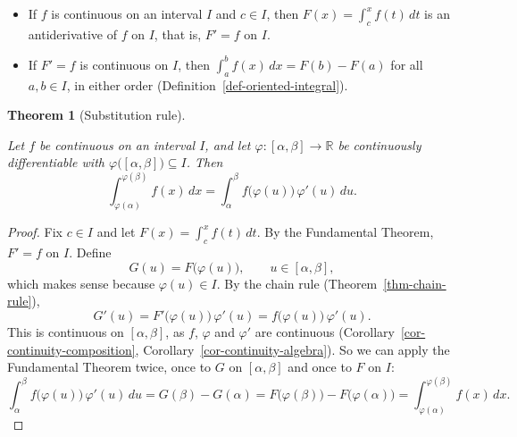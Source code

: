 \documentclass[
  letterpaper,
  DIV=11,
  numbers=noendperiod]{scrreprt}
\providecommand{\tightlist}{%
  \setlength{\itemsep}{0pt}\setlength{\parskip}{0pt}}
\theoremstyle{plain}
\theoremstyle{plain}
\theoremstyle{definition}
\theoremstyle{definition}
\theoremstyle{definition}
\theoremstyle{plain}
\newtheorem{theorem}{Theorem}[chapter]
\theoremstyle{plain}
\theoremstyle{remark}
\begin{document}
\begin{itemize}
\tightlist
\item
  If \(f\) is continuous on an interval \(I\) and \(c\in I\), then
  \(F(x) = \int_c^x f(t)\,dt\) is an antiderivative of \(f\) on \(I\),
  that is, \(F'=f\) on \(I\).
\item
  If \(F'=f\) is continuous on \(I\), then
  \(\int_a^b f(x)\,dx = F(b)-F(a)\) for all \(a,b\in I\), in either
  order (Definition~\ref{def-oriented-integral}).
\end{itemize}

\begin{theorem}[Substitution
rule]\protect\hypertarget{thm-substitution}{}\label{thm-substitution}

Let \(f\) be continuous on an interval \(I\), and let
\(\varphi\colon[\alpha,\beta]\to\mathbb{R}\) be continuously
differentiable with \(\varphi\big([\alpha,\beta]\big)\subseteq I\). Then
\[
\int_{\varphi(\alpha)}^{\varphi(\beta)} f(x)\,dx = \int_\alpha^\beta f\big(\varphi(u)\big)\,\varphi'(u)\,du .
\]

\end{theorem}

\begin{proof}
Fix \(c\in I\) and let \(F(x) = \int_c^x f(t)\,dt\). By the Fundamental
Theorem, \(F'=f\) on \(I\). Define \[
G(u) = F\big(\varphi(u)\big), \qquad u\in[\alpha,\beta],
\] which makes sense because \(\varphi(u)\in I\). By the chain rule
(Theorem~\ref{thm-chain-rule}), \[
G'(u) = F'\big(\varphi(u)\big)\,\varphi'(u) = f\big(\varphi(u)\big)\,\varphi'(u).
\] This is continuous on \([\alpha,\beta]\), as \(f\), \(\varphi\) and
\(\varphi'\) are continuous (Corollary~\ref{cor-continuity-composition},
Corollary~\ref{cor-continuity-algebra}). So we can apply the Fundamental
Theorem twice, once to \(G\) on \([\alpha,\beta]\) and once to \(F\) on
\(I\): \[
\int_\alpha^\beta f\big(\varphi(u)\big)\,\varphi'(u)\,du = G(\beta)-G(\alpha)
= F\big(\varphi(\beta)\big)-F\big(\varphi(\alpha)\big)
= \int_{\varphi(\alpha)}^{\varphi(\beta)} f(x)\,dx .
\]
\end{proof}
\end{document}
